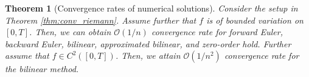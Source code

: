 \documentclass{article}
\newtheorem{theorem}{Theorem}
\theoremstyle{definition}
\begin{document}


\begin{theorem} [Convergence rates of numerical solutions] \label{thm:conv_rate}
    Consider the setup in Theorem \ref{thm:conv_riemann}. Assume further that $f$ is of bounded variation on $[0,T]$. Then, we can obtain $\mathcal{O}(1/n)$ convergence rate for forward Euler, backward Euler, bilinear, approximated bilinear, and zero-order hold.     
    Further assume that $f \in C^2([0,T])$. Then, we attain $\mathcal{O}(1/n^2)$ convergence rate for the bilinear method.
\end{theorem}
\end{document}
